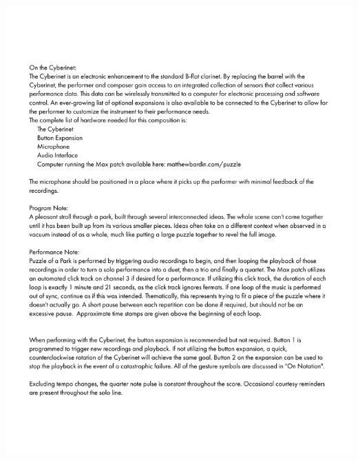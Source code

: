     \begin{center}
    \includegraphics[scale=0.75]{Scores/puzzlePart3.pdf}
    \end{center}
    \newpage
